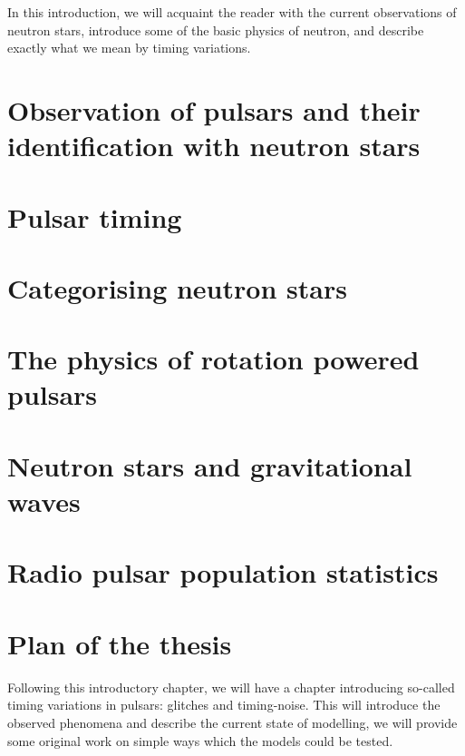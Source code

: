 \documentclass[../full_thesis/full_thesis.tex]{subfiles}
\newcommand{\thisdir}{../introduction}
\begin{document}
In this introduction, we will acquaint the reader with the current observations
of neutron stars, introduce some of the basic physics of neutron, and describe
exactly what we mean by timing variations.

\section{Observation of pulsars and their identification with neutron stars}


\section{Pulsar timing}
\label{sec: pulsar timing methods}


\section{Categorising neutron stars}
\label{sec: categorising neutron stars}


\section{The physics of rotation powered pulsars} 
\label{sec: rotation powered pulsars}


\section{Neutron stars and gravitational waves}
\label{sec: gravitational waves}


\section{Radio pulsar population statistics}
\label{sec: population stats}



\section{Plan of the thesis}

Following this introductory chapter, we will have a chapter introducing
so-called timing variations in pulsars: glitches and timing-noise. This will
introduce the observed phenomena and describe the current state of modelling,
we will provide some original work on simple ways which the models could be
tested.
\end{document}
